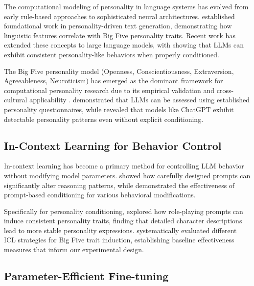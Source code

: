 The computational modeling of personality in language systems has evolved from early rule-based approaches to sophisticated neural architectures. \citet{mairesse-walker-2007-personage} established foundational work in personality-driven text generation, demonstrating how linguistic features correlate with Big Five personality traits. Recent work has extended these concepts to large language models, with \citet{jiang-etal-2023-personallm} showing that LLMs can exhibit consistent personality-like behaviors when properly conditioned.

The Big Five personality model (Openness, Conscientiousness, Extraversion, Agreeableness, Neuroticism) has emerged as the dominant framework for computational personality research due to its empirical validation and cross-cultural applicability \citep{costa-mccrae-1992-big5}. \citet{karra-etal-2022-ai-personality} demonstrated that LLMs can be assessed using established personality questionnaires, while \citet{huang-etal-2023-chatgpt-personality} revealed that models like ChatGPT exhibit detectable personality patterns even without explicit conditioning.

\subsection{In-Context Learning for Behavior Control}

In-context learning has become a primary method for controlling LLM behavior without modifying model parameters. \citet{wei-etal-2022-chain-of-thought} showed how carefully designed prompts can significantly alter reasoning patterns, while \citet{liu-etal-2023-pre-train-prompt-tune} demonstrated the effectiveness of prompt-based conditioning for various behavioral modifications.

Specifically for personality conditioning, \citet{wang-etal-2023-roleplay-prompting} explored how role-playing prompts can induce consistent personality traits, finding that detailed character descriptions lead to more stable personality expressions. \citet{li-etal-2023-personality-prompting} systematically evaluated different ICL strategies for Big Five trait induction, establishing baseline effectiveness measures that inform our experimental design.

\subsection{Parameter-Efficient Fine-tuning}

